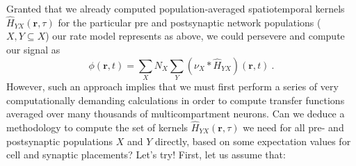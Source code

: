 Granted that we already computed population-averaged spatiotemporal kernels $\hat{H}_{YX}(\mathbf{r}, \tau)$ for the particular pre and postsynaptic network populations ($X, Y \subseteq X$) our rate model represents as above,
we could persevere and compute our signal as
\begin{equation}
\phi(\mathbf{r}, t) = \sum_X N_X \sum_Y \left( \nu_X \ast \hat{H}_{YX} \right)(\mathbf{r}, t) ~.
\end{equation}
However, such an approach implies that we must first perform a series of very computationally demanding calculations
in order to compute transfer functions averaged over many thousands of multicompartment neurons.
Can we deduce a methodology to compute the set of kernels $\hat{H}_{YX}(\mathbf{r}, \tau)$ we need for all pre- and postsynaptic populations $X$ and $Y$ directly,
based on some expectation values for cell and synaptic placements?
Let's try!
First, let us assume that:
